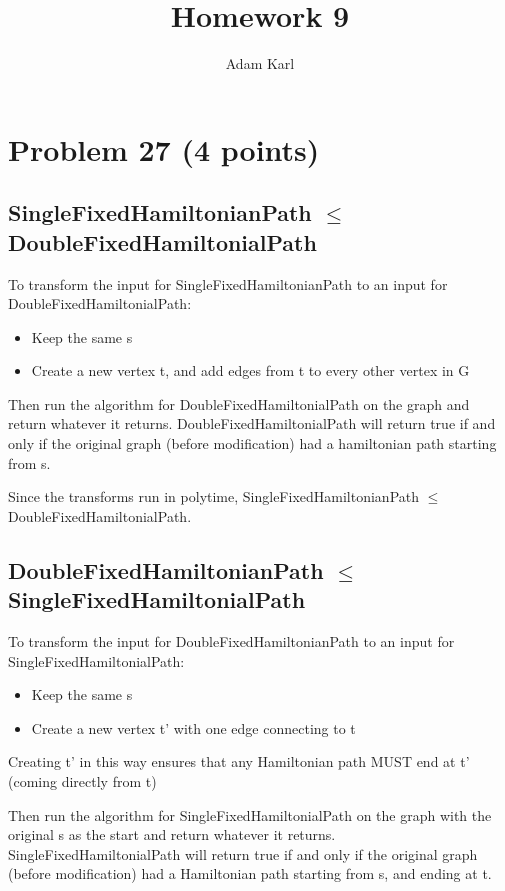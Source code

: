 \documentclass[a4paper]{article}
\title{Homework 9}
\author{Adam Karl}
\begin{document}
\maketitle

\section{Problem 27 (4 points)}
\subsection{SingleFixedHamiltonianPath $\leq$ DoubleFixedHamiltonialPath}
To transform the input for SingleFixedHamiltonianPath to an input for DoubleFixedHamiltonialPath:

\begin{itemize}
    \item Keep the same s
    \item Create a new vertex t, and add edges from t to every other vertex in G
\end{itemize}

Then run the algorithm for DoubleFixedHamiltonialPath on the graph and return whatever it returns. DoubleFixedHamiltonialPath will return true if and only if the original graph (before modification) had a hamiltonian path starting from s.

Since the transforms run in polytime, SingleFixedHamiltonianPath $\leq$ DoubleFixedHamiltonialPath.

\subsection{DoubleFixedHamiltonianPath $\leq$ SingleFixedHamiltonialPath}
To transform the input for DoubleFixedHamiltonianPath to an input for SingleFixedHamiltonialPath:

\begin{itemize}
    \item Keep the same s
    \item Create a new vertex t' with one edge connecting to t
\end{itemize}

Creating t' in this way ensures that any Hamiltonian path MUST end at t' (coming directly from t)

Then run the algorithm for SingleFixedHamiltonialPath on the graph with the original s as the start and return whatever it returns. SingleFixedHamiltonialPath will return true if and only if the original graph (before modification) had a Hamiltonian path starting from s, and ending at t.
\end{document}
